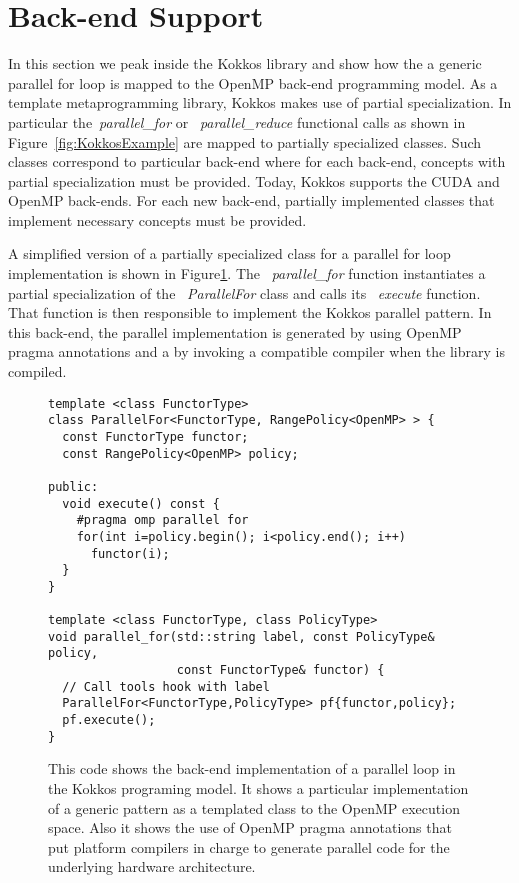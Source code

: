 
\section{Back-end Support}\label{chap:backend}

In this section we peak inside the Kokkos library and show how the a generic parallel for loop is mapped to the OpenMP back-end programming model. As a template metaprogramming library, Kokkos makes use of partial specialization. In particular the~\emph{parallel\_for} or ~\emph{parallel\_reduce} functional calls as shown in Figure~\ref{fig:KokkosExample} are mapped to partially specialized classes. Such classes correspond to particular back-end where for each back-end, concepts with partial specialization must be provided. Today, Kokkos supports the CUDA and OpenMP back-ends. For each new back-end, partially implemented classes that implement necessary concepts must be provided.

A simplified version of a partially specialized class for a parallel for loop implementation is shown in Figure\ref{fig:KokkosExampleOMPBackEnd}. The ~\emph{parallel\_for} function instantiates a partial specialization of the ~\emph{ParallelFor} class and calls its ~\emph{execute} function. That function is then responsible to implement the Kokkos parallel pattern. In this back-end, the parallel implementation is generated by using OpenMP pragma annotations and a by invoking a compatible compiler when the library is compiled. 
\begin{figure}
\begin{small}
\begin{Verbatim}[frame=leftline]
template <class FunctorType>
class ParallelFor<FunctorType, RangePolicy<OpenMP> > {
  const FunctorType functor;
  const RangePolicy<OpenMP> policy; 

public:
  void execute() const {
    #pragma omp parallel for
    for(int i=policy.begin(); i<policy.end(); i++)
      functor(i);
  }
}

template <class FunctorType, class PolicyType>
void parallel_for(std::string label, const PolicyType& policy,
                  const FunctorType& functor) {
  // Call tools hook with label
  ParallelFor<FunctorType,PolicyType> pf{functor,policy};
  pf.execute();
}

\end{Verbatim}
\end{small}
\caption{This code shows the back-end implementation of a parallel loop in the Kokkos programing model. It shows a particular implementation of a generic pattern as a templated class to the OpenMP execution space. Also it shows the use of OpenMP pragma annotations that put platform compilers in charge to generate parallel code for the underlying hardware architecture.}
\label{fig:KokkosExampleOMPBackEnd}
\end{figure}


